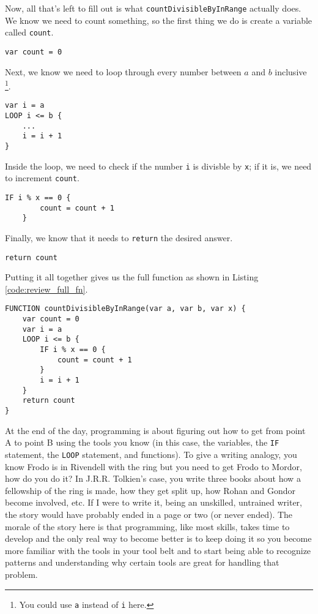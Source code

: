 \documentclass{article}
\begin{document}
Now, all that's left to fill out is what \lstinline{countDivisibleByInRange} actually does.
We know we need to count something, so the first thing we do is create a variable called \lstinline{count}.
\begin{lstlisting}[caption={Count.}, label={code:review_var_count}]
var count = 0
\end{lstlisting}
Next, we know we need to loop through every number between $a$ and $b$ inclusive \footnote{You could use \lstinline{a} instead of \lstinline{i} here.}.
\begin{lstlisting}[caption={Loop.}, label={code:review_loop}]
var i = a
LOOP i <= b {
    ...
    i = i + 1
}
\end{lstlisting}
Inside the loop, we need to check if the number \lstinline{i} is divisble by \lstinline{x}; if it is, we need to increment \lstinline{count}.
\begin{lstlisting}[caption={Check and Increment.}, label={code:review_check_inc}]
    IF i % x == 0 {
        count = count + 1
    }
\end{lstlisting}
Finally, we know that it needs to \lstinline{return} the desired answer.
\begin{lstlisting}[caption={Return.}, label={code:review_return}]
return count
\end{lstlisting}

Putting it all together gives us the full function as shown in Listing \ref{code:review_full_fn}.
\begin{lstlisting}[caption={Full function.}, label={code:review_full_fn}]
FUNCTION countDivisibleByInRange(var a, var b, var x) {
    var count = 0
    var i = a
    LOOP i <= b {
        IF i % x == 0 {
            count = count + 1
        }
        i = i + 1
    }
    return count
}
\end{lstlisting}

At the end of the day, programming is about figuring out how to get from point A to point B using the tools you know (in this case, the variables, the \lstinline{IF} statement, the \lstinline{LOOP} statement, and functions).
To give a writing analogy, you know Frodo is in Rivendell with the ring but you need to get Frodo to Mordor, how do you do it?
In J.R.R. Tolkien's case, you write three books about how a fellowship of the ring is made, how they get split up, how Rohan and Gondor become involved, etc.
If I were to write it, being an unskilled, untrained writer, the story would have probably ended in a page or two (or never ended).
The morale of the story here is that programming, like most skills, takes time to develop and the only real way to become better is to keep doing it so you become more familiar with the tools in your tool belt and to start being able to recognize patterns and understanding why certain tools are great for handling that problem.
\end{document}
